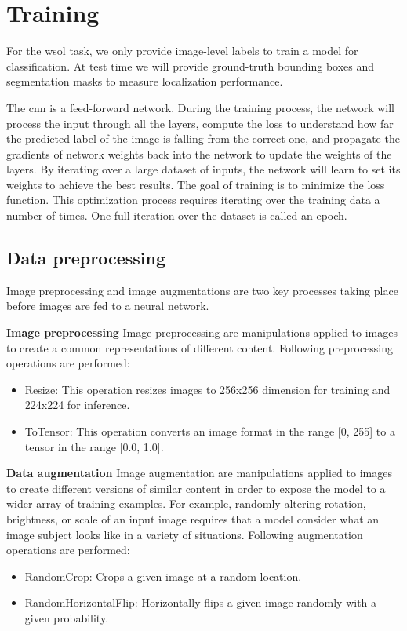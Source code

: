 \section{Training}
For the \acrlong{wsol} task, we only provide image-level labels to train a model for classification. At test time we will provide ground-truth bounding boxes and segmentation masks  to measure localization performance.

The \acrshort{cnn} is a feed-forward network. During the training process, the network will process the input through all the layers, compute the loss to understand how far the predicted label of the image is falling from the correct one, and propagate the gradients of network weights back into the network to update the weights of the layers. By iterating over a large dataset of inputs, the network will learn to set its weights to achieve the best results. The goal of training is to minimize the loss function. This optimization process requires iterating over the training data a number of times. One full iteration over the dataset is called an epoch.

\subsection{Data preprocessing}
Image preprocessing and image augmentations are two key processes taking place before images are fed to a neural network.

\textbf{Image preprocessing}
Image preprocessing are manipulations applied to images to create a common representations of different content. Following preprocessing operations are performed:
\begin{itemize}
    \item Resize: This operation resizes images to 256x256 dimension for training and 224x224 for inference.
    \item ToTensor: This operation converts an image format in the range [0, 255] to a tensor in the range [0.0, 1.0].
\end{itemize}
\textbf{Data augmentation}
Image augmentation are manipulations applied to images to create different versions of similar content in order to expose the model to a wider array of training examples. For example, randomly altering rotation, brightness, or scale of an input image requires that a model consider what an image subject looks like in a variety of situations. Following augmentation operations are performed:
\begin{itemize}
    \item RandomCrop: Crops a given image at a random location.
    \item RandomHorizontalFlip: Horizontally flips a given image randomly with a given probability.
\end{itemize}


